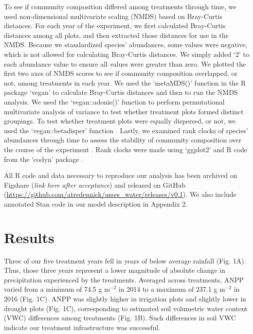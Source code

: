 \documentclass[fleqn,10pt]{wlpeerj} %
\begin{document}
To see if community composition differed among treatments through time,
we used non-dimensional multivariate scaling (NMDS) based on Bray-Curtis
distances. For each year of the experiment, we first calculated
Bray-Curtis distances among all plots, and then extracted those
distances for use in the NMDS. Because we standardized species'
abundances, some values were negative, which is not allowed for
calculating Bray-Curtis distances. We simply added `2' to each abundance
value to ensure all values were greater than zero. We plotted the first
two axes of NMDS scores to see if community composition overlapped, or
not, among treatments in each year. We used the `metaMDS()' function in
the R package `vegan' \citep{Oksanen2016} to calculate Bray-Curtis
distances and then to run the NMDS analysis. We used the
`vegan::adonis()' function \citep{Oksanen2016} to perform permutational
multivariate analysis of variance to test whether treatment plots formed
distinct groupings. To test whether treatment plots were equally
dispersed, or not, we used the `vegan::betadisper' function
\citep{Oksanen2016}. Lastly, we examined rank clocks of species'
abundances through time to assess the stability of community composition
over the course of the experiment \citep{Collins2008}. Rank clocks were
made using `ggplot2' \citep{Wickham2009} and R code from the `codyn'
package \citep{Hallett2016}.

All R code and data necessary to reproduce our analysis has been
archived on Figshare (\emph{link here after acceptance}) and released on
GitHub (\url{https://github.com/atredennick/usses_water/releases/v0.1}).
We also include annotated Stan code in our model description in Appendix
2.

\section{Results}\label{results}

Three of our five treatment years fell in years of below average
rainfall (Fig. 1A). Thus, those three years represent a lower magnitude
of absolute change in precipitation experienced by the treatments.
Averaged across treatments, ANPP varied from a minimum of 74.5 g
m\(^{-2}\) in 2014 to a maximum of 237.1 g m\(^{-2}\) in 2016 (Fig. 1C).
ANPP was slightly higher in irrigation plots and slightly lower in
drought plots (Fig. 1C), corresponding to estimated soil volumetric
water content (VWC) differences among treatments (Fig. 1B). Such
differences in soil VWC indicate our treatment infrastructure was
successful.
\end{document}
